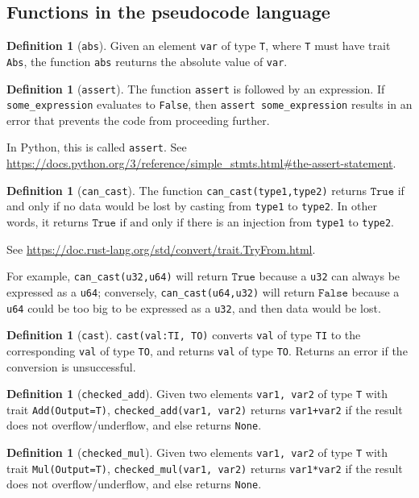 \documentclass[11pt,a4paper]{article}
\theoremstyle{definition}
\newtheorem{definition}[theorem]{Definition}
\newcommand{\True}{\texttt{True}}
\newcommand{\False}{\texttt{False}}
\newcommand{\inRust}[2]{See \url{#2}.}
\newcommand{\inPython}[2]{In Python, this is called \texttt{#1}. See \url{#2}.}
\newcommand{\iffText}{\text{if and only if}}
\begin{document}
\subsection{Functions in the pseudocode language}
\begin{definition}[\texttt{abs}]
    Given an element \texttt{var} of type \texttt{T}, where \texttt{T} must have trait \texttt{Abs}, the function \texttt{abs} reuturns the absolute value of \texttt{var}.
\end{definition}
\begin{definition}[\texttt{assert}] 
    The function \texttt{assert} is followed by an expression. If \texttt{some\_expression} evaluates to \texttt{False}, then \texttt{assert some\_expression} results in an error that prevents the code from proceeding further. 
    
    \inPython{\texttt{assert}}{https://docs.python.org/3/reference/simple_stmts.html\#the-assert-statement}
\end{definition}
\begin{definition}[\texttt{can\_cast}]
    The function \texttt{can\_cast(type1,type2)} returns $\True$ if and only if no data would be lost by casting from \texttt{type1} to \texttt{type2}. In other words, it returns $\True$ $\iffText$ there is an injection from \texttt{type1} to \texttt{type2}. 
    
    \inRust{std::convert::TryFrom}{https://doc.rust-lang.org/std/convert/trait.TryFrom.html}
\end{definition}
For example, \texttt{can\_cast(u32,u64)} will return $\True$ because a \texttt{u32} can always be expressed as a \texttt{u64}; conversely, \texttt{can\_cast(u64,u32)} will return $\False$ because a \texttt{u64} could be too big to be expressed as a \texttt{u32}, and then data would be lost.
\begin{definition}[\texttt{cast}]
    \texttt{cast(val:TI, TO)} converts \texttt{val} of type \texttt{TI} to the corresponding \texttt{val} of type \texttt{TO}, and returns \texttt{val} of type \texttt{TO}. Returns an error if the conversion is unsuccessful.
\end{definition}
\begin{definition}[\texttt{checked\_add}]
     Given two elements \texttt{var1, var2} of type \texttt{T} with trait \texttt{Add(Output=T)}, \texttt{checked\_add(var1, var2)} returns \texttt{var1+var2} if the result does not overflow/underflow, and else returns \texttt{None}.
\end{definition}
\begin{definition}[\texttt{checked\_mul}]
     Given two elements \texttt{var1, var2} of type \texttt{T} with trait \texttt{Mul(Output=T)}, \texttt{checked\_mul(var1, var2)} returns \texttt{var1*var2} if the result does not overflow/underflow, and else returns \texttt{None}.
\end{definition}
\end{document}
